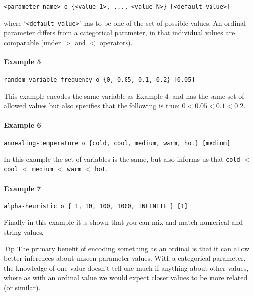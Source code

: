\documentclass[manual.tex]{subfiles}
\begin{document}
\begin{verbatim}
<parameter_name> o {<value 1>, ..., <value N>} [<default value>]
\end{verbatim}
where `\texttt{<default value>}' has to be one of the set of possible values. An ordinal parameter differs from a categorical parameter, in that individual values are comparable (under $>$ and $<$ operators). 

\paragraph{Example 5}
\begin{verbatim}
random-variable-frequency o {0, 0.05, 0.1, 0.2} [0.05]
\end{verbatim}

This example encodes the same variable as Example 4, and has the same set of allowed values but also specifies that the following is true:
$0 < 0.05 < 0.1 < 0.2$. 

\paragraph{Example 6}
\begin{verbatim}
annealing-temperature o {cold, cool, medium, warm, hot} [medium]
\end{verbatim}

In this example the set of variables is the same, but also informs us that \texttt{cold} $<$ \texttt{cool} $<$ \texttt{medium} $<$ \texttt{warm} $<$ \texttt{hot}.

\paragraph{Example 7}
\begin{verbatim}
alpha-heuristic o { 1, 10, 100, 1000, INFINITE } [1]
\end{verbatim}

Finally in this example it is shown that you can mix and match numerical and string values. 

\vspace{5pt}
\begin{bclogo}[logo=\bclampe, couleurBarre=red, noborder=true]{Tip}
The primary benefit of encoding something as an ordinal is that it can allow better inferences about unseen parameter values. With a categorical parameter, the knowledge of one value doesn't tell one much if anything about other values, where as with an ordinal value we would expect closer values to be more related (or similar).
\end{bclogo}
\end{document}
